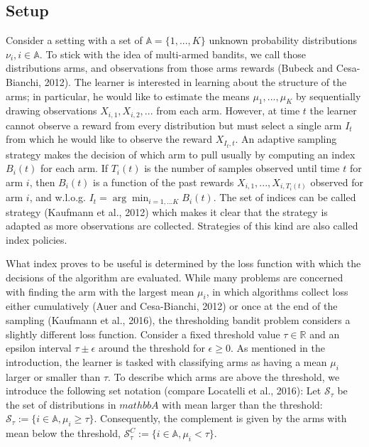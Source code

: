 \documentclass[11pt,]{article}
\begin{document}
\subsection{\texorpdfstring{Setup
\label{sec:Setup}}{Setup }}\label{setup}

Consider a setting with a set of \(\mathbb{A}=\{1, ..., K\}\) unknown
probability distributions \(\nu_i, i \in \mathbb{A}\). To stick with the
idea of multi-armed bandits, we call those distributions arms, and
observations from those arms rewards (Bubeck and Cesa-Bianchi, 2012).
The learner is interested in learning about the structure of the arms;
in particular, he would like to estimate the means \(\mu_1, ..., \mu_K\)
by sequentially drawing observations \(X_{i,1}, X_{i,2}, ...\) from each
arm. However, at time \(t\) the learner cannot observe a reward from
every distribution but must select a single arm \(I_t\) from which he
would like to observe the reward \(X_{I_t,t}\). An adaptive sampling
strategy makes the decision of which arm to pull usually by computing an
index \(B_i(t)\) for each arm. If \(T_i(t)\) is the number of samples
observed until time \(t\) for arm \(i\), then \(B_i(t)\) is a function
of the past rewards \(X_{i,1}, ..., X_{i,T_i(t)}\) observed for arm
\(i\), and w.l.o.g. \(I_t = \arg \min_{i = 1,...K} B_i(t)\). The set of
indices can be called strategy (Kaufmann et al., 2012) which makes it
clear that the strategy is adapted as more observations are collected.
Strategies of this kind are also called index policies.

What index proves to be useful is determined by the loss function with
which the decisions of the algorithm are evaluated. While many problems
are concerned with finding the arm with the largest mean \(\mu_i\), in
which algorithms collect loss either cumulatively (Auer and
Cesa-Bianchi, 2012) or once at the end of the sampling (Kaufmann et al.,
2016), the thresholding bandit problem considers a slightly different
loss function. Consider a fixed threshold value \(\tau \in \mathbb{R}\)
and an epsilon interval \(\tau \pm \epsilon\) around the threshold for
\(\epsilon \geq 0\). As mentioned in the introduction, the learner is
tasked with classifying arms as having a mean \(\mu_i\) larger or
smaller than \(\tau\). To describe which arms are above the threshold,
we introduce the following set notation (compare Locatelli et al.,
2016): Let \(\mathcal{S}_{\tau}\) be the set of distributions in
\(mathbb{A}\) with mean larger than the threshold:
\(\mathcal{S}_{\tau} := \{i \in \mathbb{A}, \mu_i \geq \tau\}\).
Consequently, the complement is given by the arms with mean below the
threshold,
\(\mathcal{S}^C_{\tau} := \{i \in \mathbb{A}, \mu_i < \tau\}\).
\end{document}
